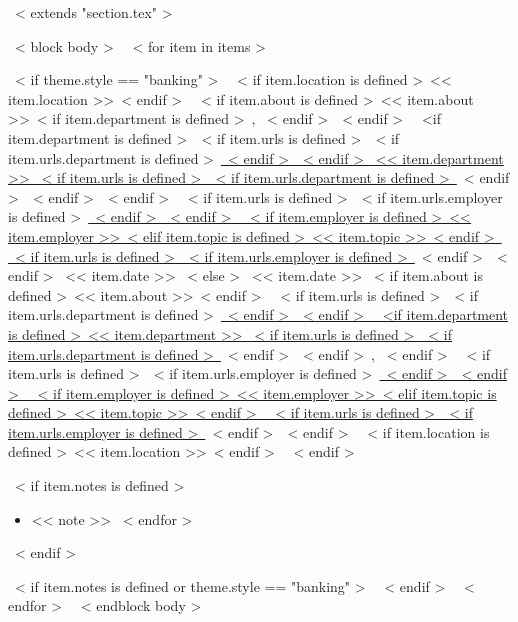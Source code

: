 ~< extends "section.tex" >~

~< block body >~
  ~< for item in items >~
    \begin{samepage}
      \cventry
        ~< if theme.style == "banking" >~
          {~< if item.location is defined >~<< item.location >>~< endif >~}
          {~< if item.about is defined >~<< item.about >>~< if item.department is defined >~, ~< endif >~~< endif >~%
	    ~<if item.department is defined >~~< if item.urls is defined >~~< if item.urls.department is defined >~\href{<< item.urls.department >>}{~< endif >~~< endif >~
	      << item.department >>
	    ~< if item.urls is defined >~~< if item.urls.department is defined >~}~< endif >~~< endif >~~< endif >~}
          {~< if item.urls is defined >~~< if item.urls.employer is defined >~\href{<< item.urls.employer >>}{~< endif >~~< endif >~%
             ~< if item.employer is defined >~<< item.employer >>~< elif item.topic is defined >~<< item.topic >>~< endif >~%
           ~< if item.urls is defined >~~< if item.urls.employer is defined >~}~< endif >~~< endif >~}
          {<< item.date >>}
        ~< else >~
          {<< item.date >>}
          {~< if item.about is defined >~<< item.about >>~< endif >~}
          {~< if item.urls is defined >~~< if item.urls.department is defined >~\href{<< item.urls.department >>}{~< endif >~~< endif >~%
             ~<if item.department is defined >~<< item.department >>
           ~< if item.urls is defined >~~< if item.urls.department is defined >~}~< endif >~~< endif >~, ~< endif >~
           ~< if item.urls is defined >~~< if item.urls.employer is defined >~\href{<< item.urls.employer >>}{~< endif >~~< endif >~%
             ~< if item.employer is defined >~<< item.employer >>~< elif item.topic is defined >~<< item.topic >>~< endif >~%
           ~< if item.urls is defined >~~< if item.urls.employer is defined >~}~< endif >~~< endif >~}
          {~< if item.location is defined >~<< item.location >>~< endif >~}
        ~< endif >~
        {}
        {
          ~< if item.notes is defined >~
            \begin{itemize}
              ~< for note in item.notes >~
                \item{<< note >>}
              ~< endfor >~
            \end{itemize}
          ~< endif >~
        }
    \end{samepage}
    ~< if item.notes is defined or theme.style == "banking" >~
    ~< endif >~
  ~< endfor >~
~< endblock body >~
